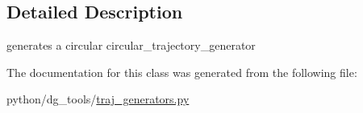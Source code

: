 \subsection{Detailed Description}
generates a circular circular\+\_\+trajectory\+\_\+generator 

The documentation for this class was generated from the following file\+:\begin{DoxyCompactItemize}
\item 
python/dg\+\_\+tools/\hyperlink{traj__generators_8py}{traj\+\_\+generators.\+py}\end{DoxyCompactItemize}
